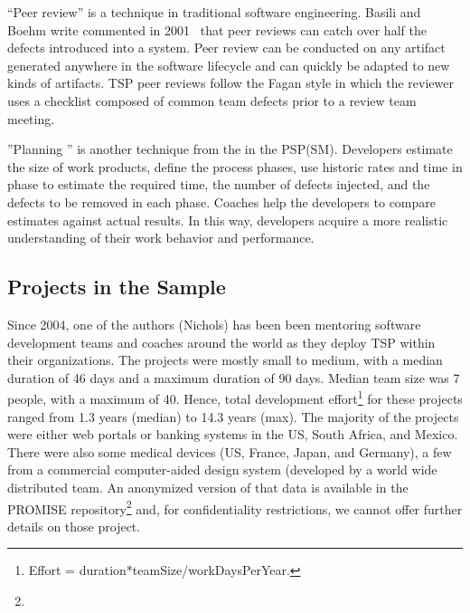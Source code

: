   
 
``Peer review'' is a  technique in
traditional software engineering.
 Basili and Boehm write  commented in 2001~\cite{boehm01} 
that peer reviews can catch over half the defects introduced into a system.
Peer review can be conducted on any artifact generated anywhere in the software
lifecycle and can quickly be adapted to new kinds of artifacts. TSP peer reviews follow the Fagan style in which the reviewer uses a checklist composed of common team defects prior to a review team meeting. 


''Planning '' is another technique from the in the PSP(SM). Developers estimate the size of work products, define the process phases, use historic rates and time in phase to estimate the required time, the number of defects injected, and the defects to be removed in each phase. Coaches help the developers to compare estimates against actual results. In this way, developers acquire a more realistic understanding of their work behavior and performance.



\subsection{Projects in the Sample}
Since 2004, one of the authors (Nichols) has been been mentoring software development teams and coaches around the world as they deploy TSP within their organizations.  
The projects
were mostly small to medium, with a median duration of 46 days
and a maximum duration of 90 days. Median team size was 7
people, with a maximum of 40. Hence,  total development 
effort\footnote{
Effort =  duration*teamSize/workDaysPerYear.} for
these projects ranged from 1.3 years (median) to 14.3 years (max).
The majority of
the projects were either web portals or banking systems in the US, South Africa, and Mexico. 
There were also some  medical devices (US, France, Japan, and Germany),  a few from a commercial 
computer-aided design system (developed by a world wide distributed team.
 An anonymized version of that data is available in the PROMISE repository\footnote{} and,
 for confidentiality restrictions, we cannot offer 
further details
on those project.  

